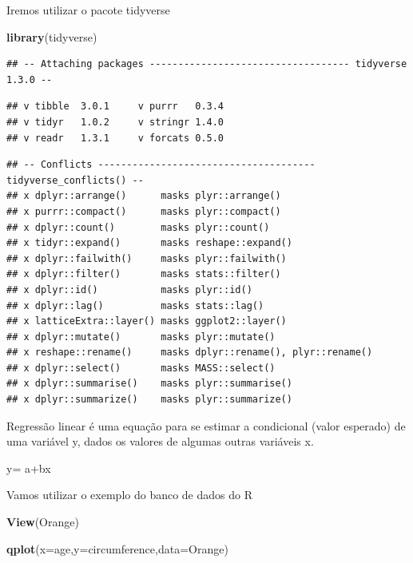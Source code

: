 \documentclass[
]{book}
\newenvironment{Shaded}{\begin{snugshade}}{\end{snugshade}}
\newcommand{\DataTypeTok}[1]{\textcolor[rgb]{0.13,0.29,0.53}{#1}}
\newcommand{\KeywordTok}[1]{\textcolor[rgb]{0.13,0.29,0.53}{\textbf{#1}}}
\newcommand{\NormalTok}[1]{#1}
\begin{document}
Iremos utilizar o pacote tidyverse

\begin{Shaded}
\begin{Highlighting}[]
\KeywordTok{library}\NormalTok{(tidyverse)}
\end{Highlighting}
\end{Shaded}

\begin{verbatim}
## -- Attaching packages ----------------------------------- tidyverse 1.3.0 --
\end{verbatim}

\begin{verbatim}
## v tibble  3.0.1     v purrr   0.3.4
## v tidyr   1.0.2     v stringr 1.4.0
## v readr   1.3.1     v forcats 0.5.0
\end{verbatim}

\begin{verbatim}
## -- Conflicts -------------------------------------- tidyverse_conflicts() --
## x dplyr::arrange()      masks plyr::arrange()
## x purrr::compact()      masks plyr::compact()
## x dplyr::count()        masks plyr::count()
## x tidyr::expand()       masks reshape::expand()
## x dplyr::failwith()     masks plyr::failwith()
## x dplyr::filter()       masks stats::filter()
## x dplyr::id()           masks plyr::id()
## x dplyr::lag()          masks stats::lag()
## x latticeExtra::layer() masks ggplot2::layer()
## x dplyr::mutate()       masks plyr::mutate()
## x reshape::rename()     masks dplyr::rename(), plyr::rename()
## x dplyr::select()       masks MASS::select()
## x dplyr::summarise()    masks plyr::summarise()
## x dplyr::summarize()    masks plyr::summarize()
\end{verbatim}

Regressão linear é uma equação para se estimar a condicional (valor esperado) de
uma variável y, dados os valores de algumas outras variáveis x.

y= a+bx

Vamos utilizar o exemplo do banco de dados do R

\begin{Shaded}
\begin{Highlighting}[]
\KeywordTok{View}\NormalTok{(Orange)}
\end{Highlighting}
\end{Shaded}

\begin{Shaded}
\begin{Highlighting}[]
\KeywordTok{qplot}\NormalTok{(}\DataTypeTok{x=}\NormalTok{age,}\DataTypeTok{y=}\NormalTok{circumference,}\DataTypeTok{data=}\NormalTok{Orange)}
\end{Highlighting}
\end{Shaded}
\end{document}
